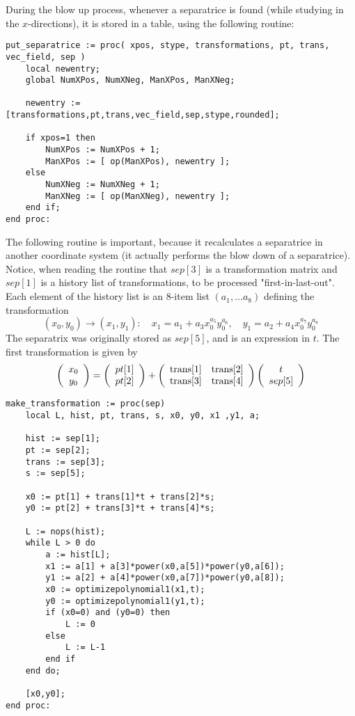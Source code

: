 \documentclass[a4paper,10pt]{article}
\begin{document}
During the blow up process, whenever a separatrice is found (while studying in the $x$-directions),
it is stored in a table, using the following routine:

\begin{lstlisting}[name=blowup]
put_separatrice := proc( xpos, stype, transformations, pt, trans, vec_field, sep )
    local newentry;
    global NumXPos, NumXNeg, ManXPos, ManXNeg;

    newentry := [transformations,pt,trans,vec_field,sep,stype,rounded];

    if xpos=1 then
        NumXPos := NumXPos + 1;
        ManXPos := [ op(ManXPos), newentry ];
    else
        NumXNeg := NumXNeg + 1;
        ManXNeg := [ op(ManXNeg), newentry ];
    end if;
end proc:
\end{lstlisting}

The following routine is important, because it recalculates a separatrice in another coordinate system (it
actually performs the blow down of a separatrice).
Notice, when reading the routine that $sep[3]$ is a transformation matrix and $sep[1]$ is a history
list of transformations, to be processed "first-in-last-out".  Each element of the history list is an $8$-item list
$(a_1,\dots a_8)$ defining the transformation
\[
    (x_0,y_0)\to (x_1,y_1)\colon\quad
    x_1 = a_1 + a_3x_0^{a_5}y_0^{a_6},\quad
    y_1 = a_2 + a_4x_0^{a_7}y_0^{a_8}
\]
The separatrix was originally stored as $sep[5]$, and is an expression in $t$.  The first transformation is
given by
\[
    \left(\begin{array}{c}x_0\\y_0\end{array}\right) =
    \left(\begin{array}{c}pt[1]\\pt[2]\end{array}\right) + \left(\begin{array}{cc} \hbox{trans}[1] & \hbox{trans}[2]    \\
    \hbox{trans}[3] & \hbox{trans}[4]\end{array}\right)
    \left(\begin{array}{c}t\\sep[5]\end{array}\right)
\]

\begin{lstlisting}[name=blowup]
make_transformation := proc(sep)
    local L, hist, pt, trans, s, x0, y0, x1 ,y1, a;

    hist := sep[1];
    pt := sep[2];
    trans := sep[3];
    s := sep[5];

    x0 := pt[1] + trans[1]*t + trans[2]*s;
    y0 := pt[2] + trans[3]*t + trans[4]*s;

    L := nops(hist);
    while L > 0 do
        a := hist[L];
        x1 := a[1] + a[3]*power(x0,a[5])*power(y0,a[6]);
        y1 := a[2] + a[4]*power(x0,a[7])*power(y0,a[8]);
        x0 := optimizepolynomial1(x1,t);
        y0 := optimizepolynomial1(y1,t);
        if (x0=0) and (y0=0) then
            L := 0
        else
            L := L-1
        end if
    end do;

    [x0,y0];
end proc:
\end{lstlisting}
\end{document}
